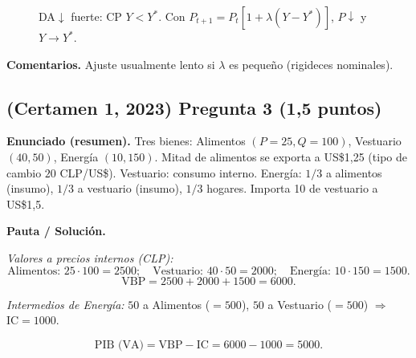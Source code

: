 \documentclass[11pt,addpoints]{article}
\begin{document}
\begin{figure}[h!]
\centering
{}
\caption{DA$\downarrow$ fuerte: CP $Y<Y^*$. Con $P_{t+1}=P_t[1+\lambda(Y-Y^*)]$, $P\downarrow$ y $Y\to Y^*$.}
\end{figure}

\textbf{Comentarios.} Ajuste usualmente lento si \(\lambda\) es pequeño (rigideces nominales).

\subsection*{(Certamen 1, 2023) \quad Pregunta 3 (1,5 puntos)}
\textbf{Enunciado (resumen).} Tres bienes: Alimentos \((P=25,Q=100)\), Vestuario \((40,50)\), Energía \((10,150)\). Mitad de alimentos se exporta a US\$1{,}25 (tipo de cambio \(20\) CLP/US\$). Vestuario: consumo interno. Energía: \(1/3\) a alimentos (insumo), \(1/3\) a vestuario (insumo), \(1/3\) hogares. Importa 10 de vestuario a US\$1{,}5.

\textbf{Pauta / Solución.}

\textit{Valores a precios internos (CLP):}
\[
\text{Alimentos: } 25\cdot 100 = 2500;\quad
\text{Vestuario: } 40\cdot 50 = 2000;\quad
\text{Energía: } 10\cdot 150 = 1500.
\]
\[
\text{VBP} = 2500 + 2000 + 1500 = \boxed{6000}.
\]

\textit{Intermedios de Energía:} \(50\) a Alimentos (\(=500\)), \(50\) a Vestuario (\(=500\)) \(\Rightarrow\) \(\text{IC}=1000\).

\[
\text{PIB (VA)} = \text{VBP} - \text{IC} = 6000 - 1000 = \boxed{5000}.
\]
\end{document}

